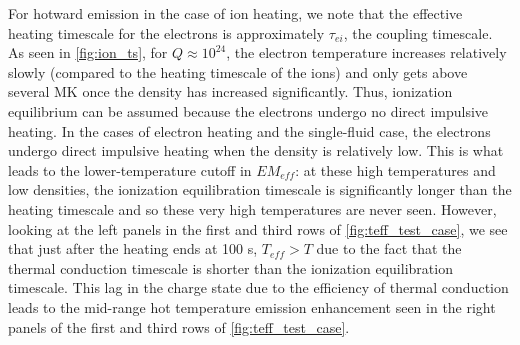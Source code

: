 \documentclass[apj]{emulateapj}
\begin{document}
	For hotward emission in the case of ion heating, we note that the effective heating timescale for the electrons is approximately $\tau_{ei}$, the coupling timescale. As seen in \autoref{fig:ion_ts}, for $Q\approx10^{24}$, the electron temperature increases relatively slowly (compared to the heating timescale of the ions) and only gets above several MK once the density has increased significantly. Thus, ionization equilibrium can be assumed because the electrons undergo no direct impulsive heating. In the cases of electron heating and the single-fluid case, the electrons undergo direct impulsive heating when the density is relatively low. This is what leads to the lower-temperature cutoff in $EM_{eff}$: at these high temperatures and low densities, the ionization equilibration timescale is significantly longer than the heating timescale and so these very high temperatures are never seen. However, looking at the left panels in the first and third rows of \autoref{fig:teff_test_case}, we see that just after the heating ends at 100 s, $T_{eff}>T$ due to the fact that the thermal conduction timescale is shorter than the ionization equilibration timescale. This lag in the charge state due to the efficiency of thermal conduction leads to the mid-range hot temperature emission enhancement seen in the right panels of the first and third rows of \autoref{fig:teff_test_case}. 
\end{document}
